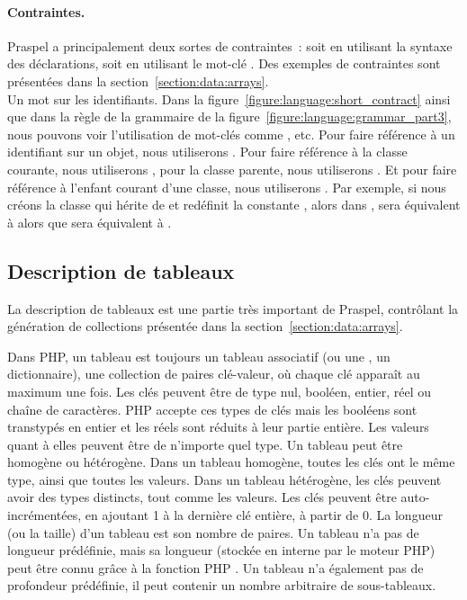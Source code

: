 \paragraph{Contraintes.} Praspel a principalement deux sortes de contraintes~:
soit en utilisant la syntaxe des déclarations, soit en utilisant le mot-clé
. Des exemples de contraintes sont présentées dans la
section~\ref{section:data:arrays}.
\\

Un mot sur les identifiants. Dans la figure~\ref{figure:language:short_contract}
ainsi que dans la règle  de la grammaire de la
figure~\ref{figure:language:grammar_part3}, nous pouvons voir l'utilisation de
mot-clés comme ,  etc. Pour faire référence à un
identifiant sur un objet, nous utiliserons . Pour faire référence à
la classe courante, nous utiliserons , pour la classe parente, nous
utiliserons . Et pour faire référence à l'enfant courant d'une
classe, nous utiliserons . Par exemple, si nous créons la classe
 qui hérite de  et redéfinit la constante
, alors dans ,  sera équivalent à
 alors que  sera équivalent à
.

\subsection{Description de tableaux}
\label{subsection:language:array}

La description de tableaux est une partie très important de Praspel, contrôlant
la génération de collections présentée dans la
section~\ref{section:data:arrays}.

Dans PHP, un tableau est toujours un {\strong tableau associatif} (ou une
, un {\strong dictionnaire}), \ie une collection de paires
clé-valeur, où chaque clé apparaît au maximum une fois. Les clés peuvent être de
type nul, booléen, entier, réel ou chaîne de caractères. PHP accepte ces types
de clés mais les booléens sont transtypés en entier et les réels sont réduits à
leur partie entière. Les valeurs quant à elles peuvent être de n'importe quel
type. Un tableau peut être {\strong homogène} ou {\strong hétérogène}. Dans un
tableau homogène, toutes les clés ont le même type, ainsi que toutes les
valeurs. Dans un tableau hétérogène, les clés peuvent avoir des types distincts,
tout comme les valeurs.  Les clés peuvent être {\strong auto-incrémentées}, en
ajoutant 1 à la dernière clé entière, à partir de 0. La {\strong longueur} (ou
la {\strong taille}) d'un tableau est son nombre de paires. Un tableau n'a pas
de longueur prédéfinie, mais sa longueur (stockée en interne par le moteur PHP)
peut être connu grâce à la fonction PHP . Un tableau n'a également
pas de profondeur prédéfinie, \ie il peut contenir un nombre arbitraire de
sous-tableaux.

